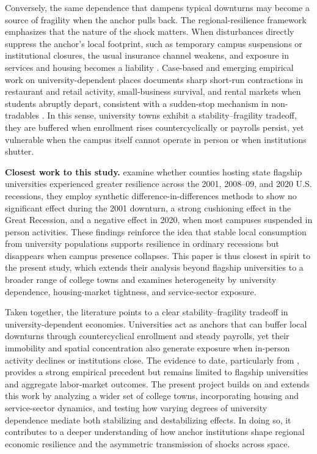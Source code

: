 \noindent Conversely, the same dependence that dampens typical downturns may become a source of fragility when the anchor pulls back. The regional-resilience framework emphasizes that the nature of the shock matters. When disturbances directly suppress the anchor's local footprint, such as temporary campus suspensions or institutional closures, the usual insurance channel weakens, and exposure in services and housing becomes a liability \citep{martinNotionRegionalEconomic2015}. Case-based and emerging empirical work on university-dependent places documents sharp short-run contractions in restaurant and retail activity, small-business survival, and rental markets when students abruptly depart, consistent with a sudden-stop mechanism in non-tradables \citep{howardUniversitiesImproveLocal2024,Harker2024AnchorReliance}. In this sense, university towns exhibit a stability–fragility tradeoff, they are buffered when enrollment rises countercyclically or payrolls persist, yet vulnerable when the campus itself cannot operate in person or when institutions shutter.


\noindent \textbf{Closest work to this study.} \citet{jumpResearchUniversitiesRecession} examine whether counties hosting state flagship universities experienced greater resilience across the 2001, 2008–09, and 2020 U.S. recessions, they employ synthetic difference-in-differences methods to show no significant effect during the 2001 downturn, a strong cushioning effect in the Great Recession, and a negative effect in 2020, when most campuses suspended in person activities. These findings reinforce the idea that stable local consumption from university populations supports resilience in ordinary recessions but disappears when campus presence collapses. This paper is thus closest in spirit to the present study, which extends their analysis beyond flagship universities to a broader range of college towns and examines heterogeneity by university dependence, housing-market tightness, and service-sector exposure.

\noindent Taken together, the literature points to a clear stability–fragility tradeoff in university-dependent economies. Universities act as anchors that can buffer local downturns through countercyclical enrollment and steady payrolls, yet their immobility and spatial concentration also generate exposure when in-person activity declines or institutions close. The evidence to date, particularly from \citet{jumpResearchUniversitiesRecession}, provides a strong empirical precedent but remains limited to flagship universities and aggregate labor-market outcomes. The present project builds on and extends this work by analyzing a wider set of college towns, incorporating housing and service-sector dynamics, and testing how varying degrees of university dependence mediate both stabilizing and destabilizing effects. In doing so, it contributes to a deeper understanding of how anchor institutions shape regional economic resilience and the asymmetric transmission of shocks across space.



